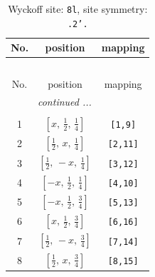 \documentclass[fleqn,8pt]{jsarticle}
\begin{document}
\begin{longtable}{ccc}
\caption{Wyckoff site: {\tt 8l}, site symmetry: {\tt .2'.}}
 \\
 \hline \hline
No. & position & mapping \\ \hline \endfirsthead

\multicolumn{2}{l}{\tablename\ \thetable{}} \\
 \hline \hline
No. & position & mapping \\ \hline \endhead

 \hline \hline
\multicolumn{2}{r}{\footnotesize\it continued ...} \\ \endfoot

 \hline \hline
\multicolumn{2}{r}{} \\ \endlastfoot

1 & $\left[ x,\, \frac{1}{2},\, \frac{1}{4} \right]$ & {\tt [1,9]} \\ \hline
2 & $\left[ \frac{1}{2},\, x,\, \frac{1}{4} \right]$ & {\tt [2,11]} \\ \hline
3 & $\left[ \frac{1}{2},\, - x,\, \frac{1}{4} \right]$ & {\tt [3,12]} \\ \hline
4 & $\left[ - x,\, \frac{1}{2},\, \frac{1}{4} \right]$ & {\tt [4,10]} \\ \hline
5 & $\left[ - x,\, \frac{1}{2},\, \frac{3}{4} \right]$ & {\tt [5,13]} \\ \hline
6 & $\left[ x,\, \frac{1}{2},\, \frac{3}{4} \right]$ & {\tt [6,16]} \\ \hline
7 & $\left[ \frac{1}{2},\, - x,\, \frac{3}{4} \right]$ & {\tt [7,14]} \\ \hline
8 & $\left[ \frac{1}{2},\, x,\, \frac{3}{4} \right]$ & {\tt [8,15]} \\
\end{longtable}
\renewcommand{\arraystretch}{1.2}
\end{document}
